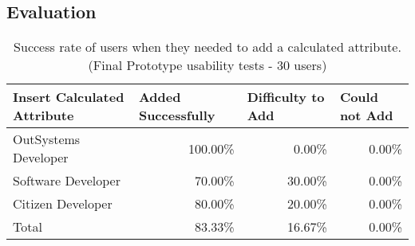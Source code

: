 \subsection{Evaluation}
\label{subsec:service_studio_evaluation}

\begin{table}[tb]
  \caption{Success rate of users when they needed to add a calculated attribute. (Final Prototype usability tests - 30 users)}
    \label{tab:finalPrototypeCalculatedAttribute}
  \begin{tabular}{@{}lrrr@{}}
  \toprule
  \textbf{Insert Calculated Attribute} & \multicolumn{1}{l}{Added Successfully} & \multicolumn{1}{l}{Difficulty to Add} & \multicolumn{1}{l}{Could not Add} \\ \midrule
  OutSystems Developer                 & 100.00\%                               & 0.00\%                                & 0.00\%                            \\
  Software Developer                   & 70.00\%                                & 30.00\%                               & 0.00\%                            \\
  Citizen Developer                    & 80.00\%                                & 20.00\%                               & 0.00\%                            \\
  Total                                & 83.33\%                                & 16.67\%                               & 0.00\%                            \\ \bottomrule
  \end{tabular}
  \end{table}



